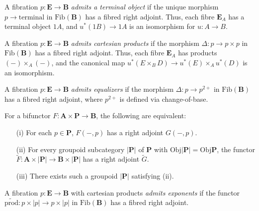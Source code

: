 \documentclass{article}
\begin{document}
\begin{definition}
\label{def:3.5}
A fibration $p : \mathbf{E} \to \mathbf{B}$ \emph{admits a terminal object} if the unique morphism $p \to \text{terminal}$ in $\text{Fib}(\mathbf{B})$ has a fibred right adjoint. Thus, each fibre $\mathbf{E}_A$ has a terminal object $1 A$, and $u^*(1 B) \to 1 A$ is an isomorphism for $u : A \to B$.
\end{definition}

\begin{definition}
\label{def:3.6}
A fibration $p : \mathbf{E} \to \mathbf{B}$ \emph{admits cartesian products} if the morphism $\Delta : p \to p \times p$ in $\text{Fib}(\mathbf{B})$ has a fibred right adjoint. Thus, each fibre $\mathbf{E}_A$ has products $(-) \times_A (-)$, and the canonical map $u^*(E \times_B D) \to u^*(E) \times_A u^*(D)$ is an isomorphism.
\end{definition}

\begin{definition}
\label{def:3.7}
A fibration $p : \mathbf{E} \to \mathbf{B}$ \emph{admits equalizers} if the morphism $\Delta : p \to p^{2+}$ in $\text{Fib}(\mathbf{B})$ has a fibred right adjoint, where $p^{2+}$ is defined via change-of-base.
\end{definition}

\begin{lemma}
\label{lem:3.8}
For a bifunctor $F : \mathbf{A} \times \mathbf{P} \to \mathbf{B}$, the following are equivalent:
\begin{enumerate}
    \item[(i)] For each $p \in \mathbf{P}$, $F(-, p)$ has a right adjoint $G(-, p)$.
    \item[(ii)] For every groupoid subcategory $|\mathbf{P}|$ of $\mathbf{P}$ with $\text{Obj}|\mathbf{P}| = \text{Obj} \mathbf{P}$, the functor $\tilde{F} : \mathbf{A} \times |\mathbf{P}| \to \mathbf{B} \times |\mathbf{P}|$ has a right adjoint $\tilde{G}$.
    \item[(iii)] There exists such a groupoid $|\mathbf{P}|$ satisfying (ii).
\end{enumerate}
\end{lemma}

\begin{definition}
\label{def:3.9}
A fibration $p : \mathbf{E} \to \mathbf{B}$ with cartesian products \emph{admits exponents} if the functor $\widetilde{\text{prod}} : p \times |p| \to p \times |p|$ in $\text{Fib}(\mathbf{B})$ has a fibred right adjoint.
\end{definition}
\end{document}
